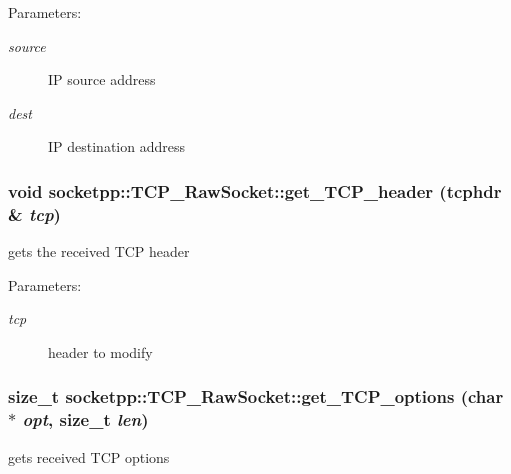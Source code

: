 \begin{Desc}
\item[Parameters:]
\begin{description}
\item[{\em source}]IP source address \item[{\em dest}]IP destination address \end{description}
\end{Desc}
\hypertarget{classsocketpp_1_1TCP__RawSocket_d7e8b2a67c856e11f0e6cfff5f8b8705}{
\subsubsection{\setlength{\rightskip}{0pt plus 5cm}void socketpp::TCP\_\-RawSocket::get\_\-TCP\_\-header (tcphdr \& {\em tcp})}}
\label{classsocketpp_1_1TCP__RawSocket_d7e8b2a67c856e11f0e6cfff5f8b8705}


gets the received TCP header 

\begin{Desc}
\item[Parameters:]
\begin{description}
\item[{\em tcp}]header to modify \end{description}
\end{Desc}
\hypertarget{classsocketpp_1_1TCP__RawSocket_75e954caea8187c5077821cd449199e7}{
\subsubsection{\setlength{\rightskip}{0pt plus 5cm}size\_\-t socketpp::TCP\_\-RawSocket::get\_\-TCP\_\-options (char $\ast$ {\em opt}, \/  size\_\-t {\em len})}}
\label{classsocketpp_1_1TCP__RawSocket_75e954caea8187c5077821cd449199e7}


gets received TCP options 

